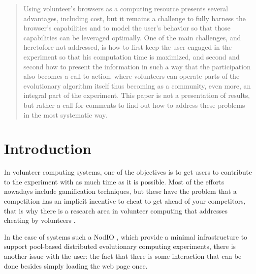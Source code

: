 \documentclass{sig-alternate}
\begin{document}
\begin{abstract}

Using volunteer's browsers as a computing resource presents several
advantages, including cost, but it remains a challenge to fully
harness the browser's capabilities and to model the user's behavior so
that those capabilities can be leveraged optimally. One of the main
challenges, and heretofore not addressed, is how to first keep the
user engaged in the experiment so that his computation time is
maximized, and second and second how to present the information in
such a way that the participation also becomes a call to action, where
volunteers can operate parts of the evolutionary algorithm itself thus
becoming as a community, even more, an integral part of the
experiment. This paper is not a presentation of results, but rather a
call for comments to find out how to address these problems in the
most systematic way.


\end{abstract}



\section{Introduction}

In volunteer computing systems, one of the objectives is to get
users to contribute to the experiment with as much time as it is possible. Most of the
efforts nowadays include gamification techniques, but these have the problem that
a competition has an implicit incentive to cheat to get ahead of your
competitors, that is why there is a research area in volunteer
computing that addresses cheating by volunteers
\cite{7300898,domingues2007sabotage}. 

In the case of systems such a NodIO \cite{2016arXiv160101607M}, which
provide a minimal infrastructure to support pool-based distributed
evolutionary computing experiments, there is another issue with the 
user: the fact that there is some interaction that can be done besides
simply loading the web page once. 
\end{document}
